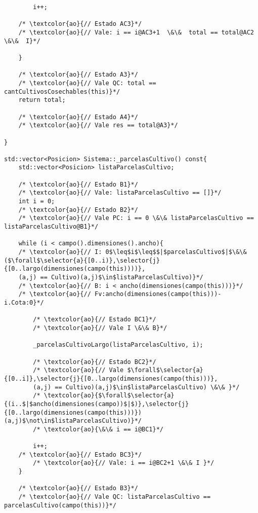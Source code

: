 \begin{lstlisting}
        i++;
    
    /* \textcolor{ao}{// Estado AC3}*/
    /* \textcolor{ao}{// Vale: i == i@AC3+1  \&\&  total == total@AC2 \&\&  I}*/
            
    }

    /* \textcolor{ao}{// Estado A3}*/	    
    /* \textcolor{ao}{// Vale QC: total == cantCultivosCosechables(this)}*/    
    return total;

    /* \textcolor{ao}{// Estado A4}*/    
    /* \textcolor{ao}{// Vale res == total@A3}*/    
    
}

std::vector<Posicion> Sistema::_parcelasCultivo() const{
    std::vector<Posicion> listaParcelasCultivo;

	/* \textcolor{ao}{// Estado B1}*/	    
    /* \textcolor{ao}{// Vale: listaParcelasCultivo == []}*/    
    int i = 0;
	/* \textcolor{ao}{// Estado B2}*/	    
    /* \textcolor{ao}{// Vale PC: i == 0 \&\& listaParcelasCultivo == listaParcelasCultivo@B1}*/    
        
    while (i < campo().dimensiones().ancho){ 
    /* \textcolor{ao}{// I: 0$\leq$i$\leq$$|$parcelasCultivo$|$\&\&($\forall$\selector{a}{[0..i)},\selector{j}{[0..largo(dimensiones(campo(this))))},
    (a,j) == Cultivo)(a,j)$\in$listaParcelasCultivo)}*/
    /* \textcolor{ao}{// B: i < ancho(dimensiones(campo(this)))}*/
    /* \textcolor{ao}{// Fv:ancho(dimensiones(campo(this)))-i.Cota:0}*/
    
    	/* \textcolor{ao}{// Estado BC1}*/   
    	/* \textcolor{ao}{// Vale I \&\& B}*/       	    
        
        _parcelasCultivoLargo(listaParcelasCultivo, i);

    	/* \textcolor{ao}{// Estado BC2}*/   
    	/* \textcolor{ao}{// Vale $\forall$\selector{a}{[0..i]},\selector{j}{[0..largo(dimensiones(campo(this)))},
    	(a,j) == Cultivo)(a,j)$\in$listaParcelasCultivo) \&\& }*/
    	/* \textcolor{ao}{$\forall$\selector{a}{(i..$|$ancho(dimensiones(campo))$|$)},\selector{j}{[0..largo(dimensiones(campo(this)))})(a,j)$\not\in$listaParcelasCultivo)}*/
    	/* \textcolor{ao}{\&\& i == i@BC1}*/

        i++;
	/* \textcolor{ao}{// Estado BC3}*/   
    	/* \textcolor{ao}{// Vale: i == i@BC2+1 \&\& I }*/        
    }
    
    /* \textcolor{ao}{// Estado B3}*/	    
    /* \textcolor{ao}{// Vale QC: listaParcelasCultivo == parcelasCultivo(campo(this))}*/    
    

\end{lstlisting}
